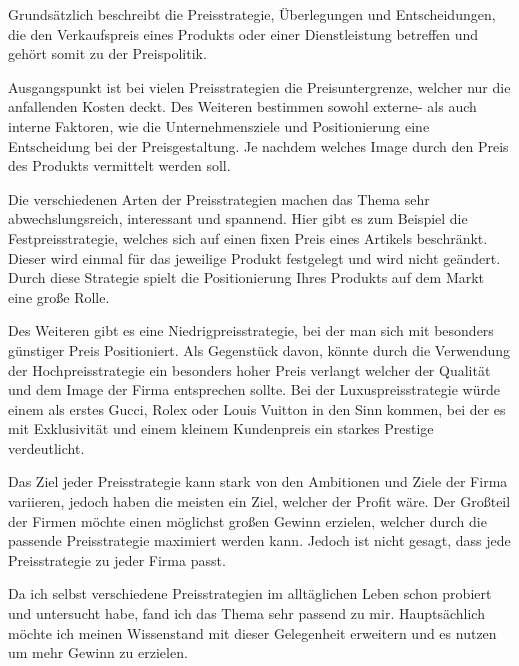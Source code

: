 
\begin{refsection}
  
Grundsätzlich beschreibt die Preisstrategie, Überlegungen und Entscheidungen, die den Verkaufspreis eines Produkts oder einer Dienstleistung betreffen und gehört somit zu der Preispolitik.

Ausgangspunkt ist bei vielen Preisstrategien die Preisuntergrenze, welcher nur die anfallenden Kosten deckt. Des Weiteren bestimmen sowohl externe- als auch interne Faktoren, wie die Unternehmensziele und Positionierung eine Entscheidung bei der Preisgestaltung. Je nachdem welches Image durch den Preis des Produkts vermittelt werden soll.

Die verschiedenen Arten der Preisstrategien machen das Thema sehr abwechslungsreich, interessant und spannend. Hier gibt es zum Beispiel die Festpreisstrategie, welches sich auf einen fixen Preis eines Artikels beschränkt. Dieser wird einmal für das jeweilige Produkt festgelegt und wird nicht geändert. Durch diese Strategie spielt die Positionierung Ihres Produkts auf dem Markt eine gro\ss{}e Rolle.

Des Weiteren gibt es eine Niedrigpreisstrategie, bei der man sich mit besonders günstiger Preis Positioniert. Als Gegenstück davon, könnte durch die Verwendung der Hochpreisstrategie ein besonders hoher Preis verlangt welcher der Qualität und dem Image der Firma entsprechen sollte. Bei der Luxuspreisstrategie würde einem als erstes Gucci, Rolex oder Louis Vuitton in den Sinn kommen, bei der es mit Exklusivität und einem kleinem Kundenpreis ein starkes Prestige verdeutlicht.

Das Ziel jeder Preisstrategie kann stark von den Ambitionen und Ziele der Firma variieren, jedoch haben die meisten ein Ziel, welcher der Profit wäre. Der Gro\ss{}teil der Firmen möchte einen möglichst gro\ss{}en Gewinn erzielen, welcher durch die passende Preisstrategie maximiert werden kann. Jedoch ist nicht gesagt, dass jede Preisstrategie zu jeder Firma passt. 

Da ich selbst verschiedene Preisstrategien im alltäglichen Leben schon probiert und untersucht habe, fand ich das Thema sehr passend zu mir. Hauptsächlich möchte ich meinen Wissenstand mit dieser Gelegenheit erweitern und es nutzen um mehr Gewinn zu erzielen.
  \clearpage
  \printbibliography[heading=subsubbibliography]
\end{refsection}
\clearpage
